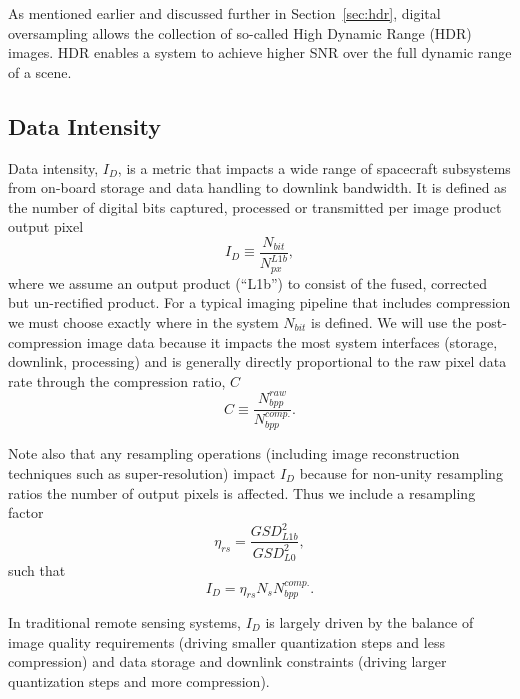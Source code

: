 \documentclass[]{spieman}  %
\begin{document}
As mentioned earlier and discussed further in Section~\ref{sec:hdr}, digital oversampling allows the collection of so-called High Dynamic Range (HDR) images.  HDR enables a system to achieve higher SNR over the full dynamic range of a scene.

\subsection{Data Intensity}
\label{sec:data_intensity}
Data intensity, $I_D$, is a metric that impacts a wide range of spacecraft subsystems from on-board storage and data handling to downlink bandwidth.  It is defined as the number of digital bits captured, processed or transmitted per image product output pixel
\begin{equation}
    I_D \equiv \frac{N_{bit}}{N_{px}^{L1b}},
\end{equation}
where we assume an output product (``L1b'') to consist of the fused, corrected but un-rectified product. For a typical imaging pipeline that includes compression we must choose exactly where in the system $N_{bit}$ is defined.  We will use the post-compression image data because it impacts the most system interfaces (storage, downlink, processing) and is generally directly proportional to the raw pixel data rate through the compression ratio, $C$
\begin{equation*}
    \label{eq:compression}
    C \equiv \frac{N_{bpp}^{raw}}{N_{bpp}^{comp.}}.
\end{equation*}

Note also that any resampling operations (including image reconstruction techniques such as super-resolution) impact $I_D$ because for non-unity resampling ratios the number of output pixels is affected.  Thus we include a resampling factor
\begin{equation*}
    \eta_{rs} = \frac{GSD_{L1b}^2}{GSD_{L0}^2},
\end{equation*}
such that
\begin{equation}
    \label{eq:I_D}
    I_D = {\eta}_{rs} N_s N_{bpp}^{comp.}.
\end{equation}

In traditional remote sensing systems, $I_D$ is largely driven by the balance of image quality requirements (driving smaller quantization steps and less compression) and data storage and downlink constraints (driving larger quantization steps and more compression).
\end{document}
